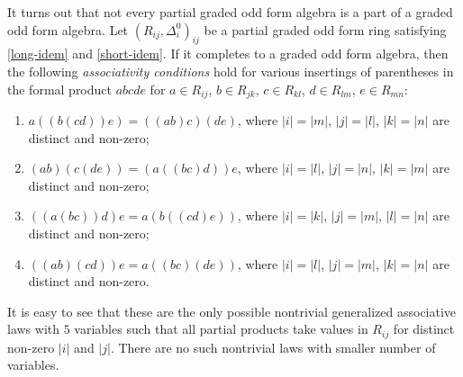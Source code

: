 \documentclass{article}
\theoremstyle{definition}
\begin{document}
It turns out that not every partial graded odd form algebra is a part of a graded odd form algebra. Let \(
    (R_{ij}, \Delta^0_i)_{ij}
\) be a partial graded odd form ring satisfying \ref{long-idem} and \ref{short-idem}. If it completes to a graded odd form algebra, then the following \textit{associativity conditions} hold for various insertings of parentheses in the formal product \(abcde\) for \(a \in R_{ij}\), \(b \in R_{jk}\), \(c \in R_{kl}\), \(d \in R_{lm}\), \(e \in R_{mn}\):
\begin{enumerate}[label = {(A\arabic*)}]

    \item \label{ass-law-l} \(
        a((b(cd))e) = ((ab)c)(de)
    \), where \(
        |i| = |m|
    \), \(
        |j| = |l|
    \), \(
        |k| = |n|
    \) are distinct and non-zero;

    \item \label{ass-law-r} \(
        (ab)(c(de)) = (a((bc)d))e
    \), where \(
        |i| = |l|
    \), \(
        |j| = |n|
    \), \(
        |k| = |m|
    \) are distinct and non-zero;

    \item \label{ass-law-sym} \(
        ((a(bc))d)e = a(b((cd)e))
    \), where \(
        |i| = |k|
    \), \(
        |j| = |m|
    \), \(
        |l| = |n|
    \) are distinct and non-zero;

    \item \label{ass-law-bal} \(
        ((ab)(cd))e = a((bc)(de))
    \), where \(
        |i| = |l|
    \), \(
        |j| = |m|
    \), \(
        |k| = |n|
    \) are distinct and non-zero.

\end{enumerate}
It is easy to see that these are the only possible nontrivial generalized associative laws with \(5\) variables such that all partial products take values in \(R_{ij}\) for distinct non-zero \(|i|\) and \(|j|\). There are no such nontrivial laws with smaller number of variables.
\end{document}
